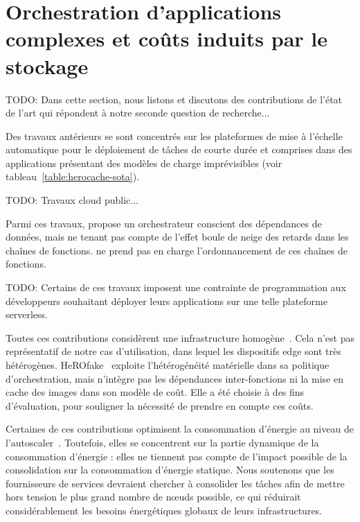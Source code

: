 \section{Orchestration d'applications complexes et coûts induits par le stockage}
\label{section:sota-herocache}

TODO: Dans cette section, nous listons et discutons des contributions de l'état de l'art qui répondent à notre seconde question de recherche...


Des travaux antérieurs se sont concentrés sur les plateformes de mise à l'échelle automatique pour le déploiement de tâches de courte durée et comprises dans des applications présentant des modèles de charge imprévisibles (voir tableau~\ref{table:herocache-sota}).

TODO: Travaux cloud public...

Parmi ces travaux, \cite{smithFaDOFaaSFunctions2022} propose un orchestrateur conscient des dépendances de données, mais ne tenant pas compte de l'effet boule de neige des retards dans les chaînes de fonctions. \cite{zhangFIRSTExploitingMultiDimensional2023} ne prend pas en charge l'ordonnancement de ces chaînes de fonctions.

TODO: Certains de ces travaux imposent une contrainte de programmation aux développeurs souhaitant déployer leurs applications sur une telle plateforme serverless.

Toutes ces contributions considèrent une infrastructure homogène~\cite{bhasiCypressInputSizesensitive2022, zijunFassflowEfficient2022, smithFaDOFaaSFunctions2022, zhangFIRSTExploitingMultiDimensional2023, abdiPaletteLoadBalancing2023}. Cela n'est pas représentatif de notre cas d'utilisation, dans lequel les dispositifs edge sont très hétérogènes. HeROfake~\cite{herofake} exploite l'hétérogénéité matérielle dans sa politique d'orchestration, mais n'intègre pas les dépendances inter-fonctions ni la mise en cache des images dans son modèle de coût. Elle a été choisie à des fins d'évaluation, pour souligner la nécessité de prendre en compte ces coûts.

Certaines de ces contributions optimisent la consommation d'énergie au niveau de l'autoscaler~\cite{bhasiCypressInputSizesensitive2022, zhangFIRSTExploitingMultiDimensional2023}. Toutefois, elles se concentrent sur la partie dynamique de la consommation d'énergie : elles ne tiennent pas compte de l'impact possible de la consolidation sur la consommation d'énergie statique. Nous soutenons que les fournisseurs de services devraient chercher à consolider les tâches afin de mettre hors tension le plus grand nombre de nœuds possible, ce qui réduirait considérablement les besoins énergétiques globaux de leurs infrastructures.

